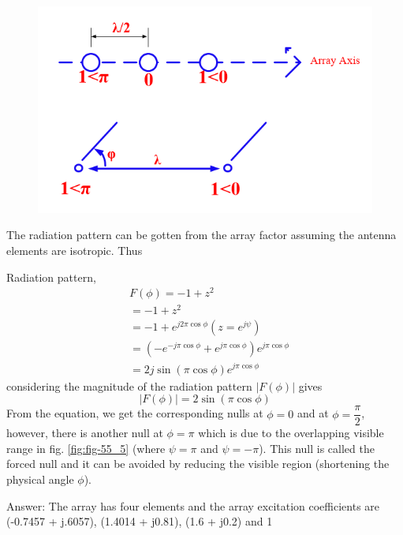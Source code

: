 \begin{exmp}
\begin{enumerate}
\begin{figure}[h]
\includegraphics[width=1\linewidth]{"./graphics/image58_4"}
\label{fig:fig-55_6}
\end{figure}
\end{enumerate}
The radiation pattern can be gotten from the array factor assuming the antenna elements are isotropic. Thus

Radiation pattern, 
\begin{align*}
&F(\phi)=-1+z^{2}\\
&=-1+z^{2}\\
&=-1+e^{j2\pi\cos\phi} (z=e^{j\psi})\\
&=(-e^{-j\pi\cos\phi} + e^{j\pi\cos\phi} )e^{j\pi\cos\phi}\\
&=2j\sin(\pi\cos\phi)e^{j\pi\cos\phi}
\end{align*}
considering the magnitude of the radiation pattern $|F(\phi)|$ gives
\begin{equation}
|F(\phi)|= 2\sin(\pi\cos\phi)
\label{eqn50}
\end{equation}
From the equation, we get the corresponding nulls at $\phi = 0$ and at $\phi = \dfrac{\pi}{2}$, however, there is another null at $\phi =\pi$ which is due to the overlapping visible range in fig. \ref{fig:fig-55_5} (where $\psi = \pi$ and $\psi = -\pi$). This null is called the forced null and it can be avoided by reducing the visible region (shortening the physical angle $\phi$).
\end{exmp}
\begin{ExerciseList}
\Exercise[title=DIY]
\end{ExerciseList}
Answer: The array has four elements and the array excitation coefficients are (-0.7457 + j.6057), (1.4014 + j0.81), (1.6 + j0.2) and 1 